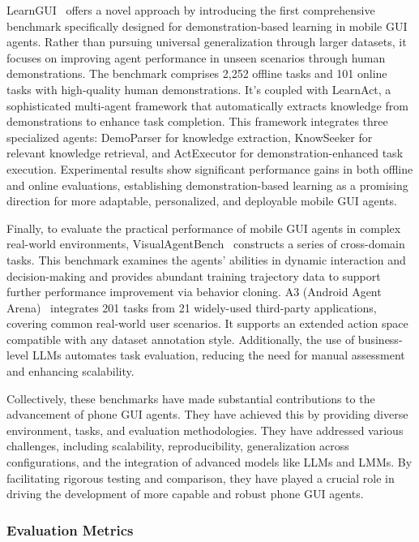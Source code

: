LearnGUI~\cite{liu2025learnact} offers a novel approach by introducing the first comprehensive benchmark specifically designed for demonstration-based learning in mobile GUI agents. Rather than pursuing universal generalization through larger datasets, it focuses on improving agent performance in unseen scenarios through human demonstrations. The benchmark comprises 2,252 offline tasks and 101 online tasks with high-quality human demonstrations. It's coupled with LearnAct, a sophisticated multi-agent framework that automatically extracts knowledge from demonstrations to enhance task completion. This framework integrates three specialized agents: DemoParser for knowledge extraction, KnowSeeker for relevant knowledge retrieval, and ActExecutor for demonstration-enhanced task execution. Experimental results show significant performance gains in both offline and online evaluations, establishing demonstration-based learning as a promising direction for more adaptable, personalized, and deployable mobile GUI agents.

Finally, to evaluate the practical performance of mobile GUI agents in complex real-world environments, VisualAgentBench~\cite{liu2024visualagentbench} constructs a series of cross-domain tasks. This benchmark examines the agents' abilities in dynamic interaction and decision-making and provides abundant training trajectory data to support further performance improvement via behavior cloning. A3 (Android Agent Arena)~\cite{chai2025a3} integrates 201 tasks from 21 widely-used third-party applications, covering common real-world user scenarios. It supports an extended action space compatible with any dataset annotation style. Additionally, the use of business-level LLMs automates task evaluation, reducing the need for manual assessment and enhancing scalability.


Collectively, these benchmarks have made substantial contributions to the advancement of phone GUI agents. They have achieved this by providing diverse environment, tasks, and evaluation methodologies. They have addressed various challenges, including scalability, reproducibility, generalization across configurations, and the integration of advanced models like LLMs and LMMs. By facilitating rigorous testing and comparison, they have played a crucial role in driving the development of more capable and robust phone GUI agents.

\subsubsection{Evaluation Metrics}
\label{subsec:eval_metrics}


